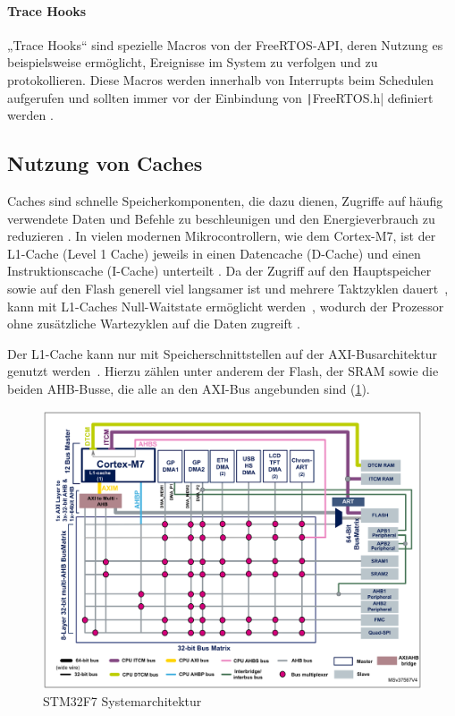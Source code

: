 \paragraph{Trace Hooks} \label{sec:trace_hooks}

„Trace Hooks“ sind spezielle Macros von der FreeRTOS-API, deren Nutzung es
beispielsweise ermöglicht, Ereignisse im System zu verfolgen und zu
protokollieren. Diese Macros werden innerhalb von Interrupts beim Schedulen
aufgerufen und sollten immer vor der Einbindung von
\texttt|FreeRTOS.h| definiert werden \cite{freertos_rtos_trace_hooks}.

\subsection{Nutzung von Caches}

Caches sind schnelle Speicherkomponenten, die dazu dienen, Zugriffe auf häufig
verwendete Daten und Befehle zu beschleunigen und den Energieverbrauch zu
reduzieren \cite{ka001150}. In vielen modernen Mikrocontrollern, wie dem
Cortex-M7, ist der L1-Cache (Level 1 Cache) jeweils in einen Datencache
(D-Cache) und einen Instruktionscache (I-Cache) unterteilt \cite[S. 6]{an4667}.
Da der Zugriff auf den Hauptspeicher sowie auf den Flash generell viel langsamer
ist und mehrere Taktzyklen dauert~\cite{stm32_memory_sections}, kann mit
L1-Caches Null-Waitstate ermöglicht werden~\cite[S. 6]{an4667}, wodurch der
Prozessor ohne zusätzliche Wartezyklen auf die Daten zugreift
\cite{waitstate_wiki}.

Der L1-Cache kann nur mit Speicherschnittstellen auf der \ac{AXI}-Busarchitektur
genutzt werden~\cite[S. 4]{an4839}. Hierzu zählen unter anderem der Flash, der
\ac{SRAM} sowie die beiden \ac{AHB}-Busse, die alle an den AXI-Bus angebunden
sind (\ref{fig:m7_sys_arch}).

\begin{figure}[htb]
    \centering
    \includegraphics[width=1\textwidth]{assets/m7_system_arch}
    \caption{STM32F7 Systemarchitektur \cite[S. 9]{an4667}}
    \label{fig:m7_sys_arch}
\end{figure}

